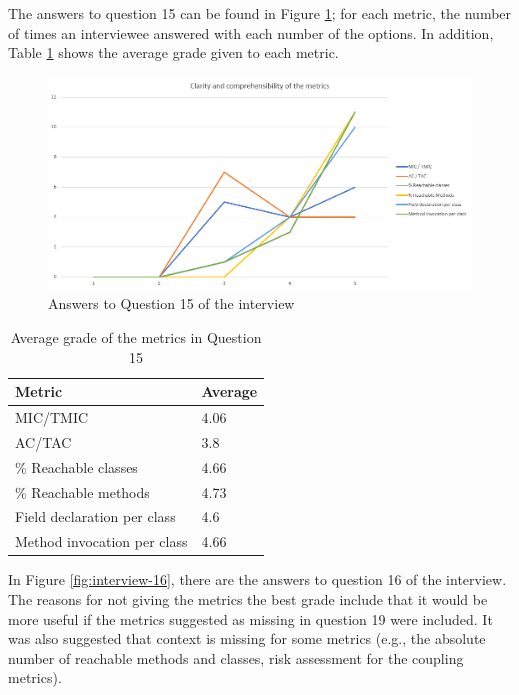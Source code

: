The answers to question 15 can be found in Figure \ref{fig:interview-15}; for each metric, the number of times an interviewee answered with each number of the options. In addition, Table \ref{table:interview-15} shows the average grade given to each metric.

\begin{figure}[ht!]
\begin{center}
\includegraphics[width=\textwidth]{figures/interview/Question15.png}
\caption{Answers to Question 15 of the interview}
\label{fig:interview-15}
\end{center}
\end{figure}

\begin{table}[ht!]
    \begin{center}
    \begin{tabular}{|l|l|}
    \hline
    Metric & Average \\
    \hline
    MIC/TMIC & 4.06 \\
    AC/TAC & 3.8 \\
    \% Reachable classes & 4.66 \\
    \% Reachable methods & 4.73 \\
    Field declaration per class & 4.6 \\
    Method invocation per class & 4.66 \\
    \hline
    \end{tabular}
    \end{center}
    \caption{Average grade of the metrics in Question 15}
    \label{table:interview-15}
\end{table}

In Figure \ref{fig:interview-16}, there are the answers to question 16 of the interview. The reasons for not giving the metrics the best grade include that it would be more useful if the metrics suggested as missing in question 19 were included. It was also suggested that context is missing for some metrics (e.g., the absolute number of reachable methods and classes, risk assessment for the coupling metrics).

